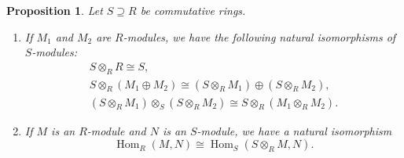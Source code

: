 \documentclass[12pt,reqno]{book}%
\newtheorem{proposition}{Proposition}[chapter]
\theoremstyle{definition}
\theoremstyle{remark}
\theoremstyle{theorem}
\theoremstyle{remark}
\DeclareMathOperator{\Hom}{Hom}
\begin{document}
\begin{proposition}\label{prop11.1}%
    Let $S \supseteq R$ be commutative rings.
    \begin{enumerate}[label=(\roman*),font=\normalfont,before=\normalfont]
        \item If $M_1$ and $M_2$ are $R$-modules, we have the following natural isomorphisms of $S$-modules:
            \begin{gather}
                S \otimes_{R} R \cong S, \label{eq11.1} \\
                S \otimes_{R} (M_1 \oplus M_2) \cong (S \otimes_{R} M_1) \oplus (S \otimes_{R} M_2), \label{eq11.2} \\
                (S \otimes_{R} M_1) \otimes_{S} (S \otimes_{R} M_2) \cong S \otimes_{R} (M_1 \otimes_{R} M_2). \label{eq11.3}
            \end{gather}
        \item If $M$ is an $R$-module and $N$ is an $S$-module, we have a natural isomorphism
            \begin{equation}\label{eq11.4}
                \Hom_R(M, N) \cong \Hom_S(S \otimes_{R} M, N).
            \end{equation}
    \end{enumerate}
\end{proposition}%
\end{document}
